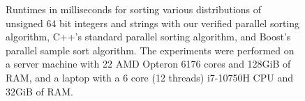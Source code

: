 \documentclass[a4paper,UKenglish,cleveref, autoref, thm-restate]{lipics-v2021}
\begin{document}
  \begin{figure}

  \caption{Runtimes in milliseconds for sorting various distributions of unsigned 64 bit integers and strings with
    our verified parallel sorting algorithm, C++'s standard parallel sorting algorithm, and Boost's parallel sample sort algorithm.
    The experiments were performed on a server machine with 22 AMD Opteron 6176 cores and 128GiB of RAM, and a laptop with a
    6 core (12 threads) i7-10750H CPU and 32GiB of RAM.
  }\label{fig:benchres}
  \end{figure}
\end{document}
